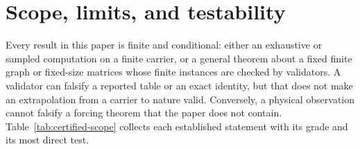\section{Scope, limits, and testability}\label{scope-limits-and-falsifiability}

Every result in this paper is finite and conditional: either an exhaustive or sampled computation on a finite
carrier, or a general theorem about a fixed finite graph or fixed-size matrices whose finite instances are checked by
validators. A validator can falsify a reported table or an exact identity, but that does not make an extrapolation from
a carrier to nature valid. Conversely, a physical observation cannot
falsify a forcing theorem that the paper does not contain. Table~\ref{tab:certified-scope} collects each established
statement with its grade and its most direct test.

